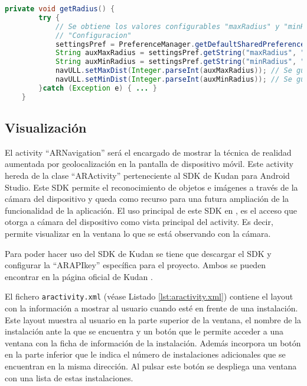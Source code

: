 \begin{lstlisting}[language=java, caption={Fichero \texttt{ARNavigation.java}, código que se encarga de obtener los valores de ``maxDist'' y ``minDist'' del objeto ``navULL''.},  label={lst:shared}]
    private void getRadius() {
        try {
            // Se obtiene los valores configurables "maxRadius" y "minRadius" en la ventana de 
            // "Configuracion"
            settingsPref = PreferenceManager.getDefaultSharedPreferences(getContext());
            String auxMaxRadius = settingsPref.getString("maxRadius", "null");
            String auxMinRadius = settingsPref.getString("minRadius", "null");
            navULL.setMaxDist(Integer.parseInt(auxMaxRadius)); // Se guarda el valor "maxRadius"
            navULL.setMinDist(Integer.parseInt(auxMinRadius)); // Se guarda el valor "minRadius"
        }catch (Exception e) { ... }
    }
\end{lstlisting}

\subsection{Visualización}

El activity ``ARNavigation'' será el encargado de mostrar la técnica de realidad aumentada por geolocalización en la pantalla de dispositivo móvil. Este activity hereda de la clase ``ARActivity'' perteneciente al  SDK de Kudan para Android Studio. Este SDK permite el reconocimiento de objetos e imágenes a través de la cámara del dispositivo y queda como recurso para una futura ampliación de la funcionalidad de la aplicación. El uso principal de este SDK en \ULLAR{}, es el acceso que otorga a cámara del dispositivo como vista principal del activity. Es decir, permite visualizar en la ventana lo que se está observando con la cámara.

Para poder hacer uso del SDK de Kudan se tiene que descargar el SDK y configurar la ``ARAPIkey'' específica para el proyecto. Ambos se pueden encontrar en la página oficial de Kudan \cite{URL::kudan}. 

El fichero \texttt{aractivity.xml} (véase Listado \ref{lst:aractivity.xml}) contiene el layout con la información a mostrar al usuario cuando esté en frente de una instalación. Este layout muestra al usuario en la parte superior de la ventana, el nombre de la instalación ante la que se encuentra y un botón que le permite acceder a una ventana con la ficha de información de la instalación. Además incorpora un botón en la parte inferior que le indica el número de instalaciones adicionales que se encuentran en la misma dirección. Al pulsar este botón se despliega una ventana con una lista de estas instalaciones.

